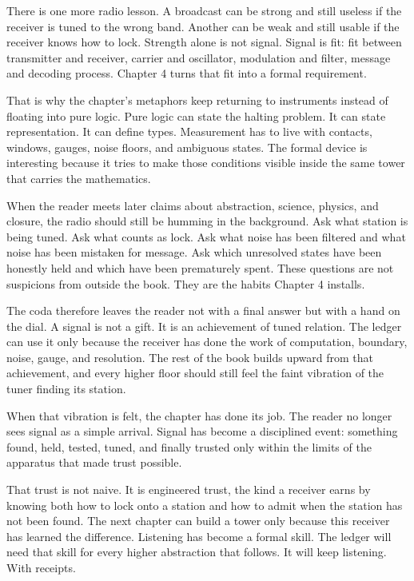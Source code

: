 There is one more radio lesson. A broadcast can be strong and still useless if
the receiver is tuned to the wrong band. Another can be weak and still usable
if the receiver knows how to lock. Strength alone is not signal. Signal is fit:
fit between transmitter and receiver, carrier and oscillator, modulation and
filter, message and decoding process. Chapter 4 turns that fit into a formal
requirement.

That is why the chapter's metaphors keep returning to instruments instead of
floating into pure logic. Pure logic can state the halting problem. It can
state representation. It can define types. Measurement has to live with
contacts, windows, gauges, noise floors, and ambiguous states. The formal
device is interesting because it tries to make those conditions visible inside
the same tower that carries the mathematics.

When the reader meets later claims about abstraction, science, physics, and
closure, the radio should still be humming in the background. Ask what station
is being tuned. Ask what counts as lock. Ask what noise has been filtered and
what noise has been mistaken for message. Ask which unresolved states have
been honestly held and which have been prematurely spent. These questions are
not suspicions from outside the book. They are the habits Chapter 4 installs.

The coda therefore leaves the reader not with a final answer but with a hand on
the dial. A signal is not a gift. It is an achievement of tuned relation. The
ledger can use it only because the receiver has done the work of computation,
boundary, noise, gauge, and resolution. The rest of the book builds upward from
that achievement, and every higher floor should still feel the faint vibration
of the tuner finding its station.

When that vibration is felt, the chapter has done its job. The reader no
longer sees signal as a simple arrival. Signal has become a disciplined event:
something found, held, tested, tuned, and finally trusted only within the
limits of the apparatus that made trust possible.

That trust is not naive. It is engineered trust, the kind a receiver earns by
knowing both how to lock onto a station and how to admit when the station has
not been found. The next chapter can build a tower only because this receiver
has learned the difference.
Listening has become a formal skill.
The ledger will need that skill for every higher abstraction that follows.
It will keep listening.
With receipts.
